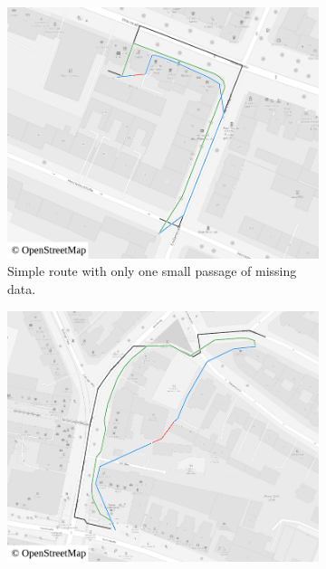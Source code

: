 			\begin{figure}[h!]
				\begin{minipage}[t]{.48\textwidth}
					\begin{subfigure}[t]{\linewidth}
						\begin{figcenter}
							\includegraphics[width=\textwidth]{images/qgis-routing-city-routing-1}
						\end{figcenter}
						\caption{Simple route with only one small passage of missing data.}
						\label{fig:eval-city-usefulness-1}
					\end{subfigure}
				\end{minipage}
				\hfill
				\begin{minipage}[t]{.48\textwidth}
					\begin{subfigure}[t]{\linewidth}
						\begin{figcenter}
							\includegraphics[width=\textwidth]{images/qgis-routing-city-routing-3}

\end{figcenter}
\end{subfigure}
\end{minipage}
\end{figure}
